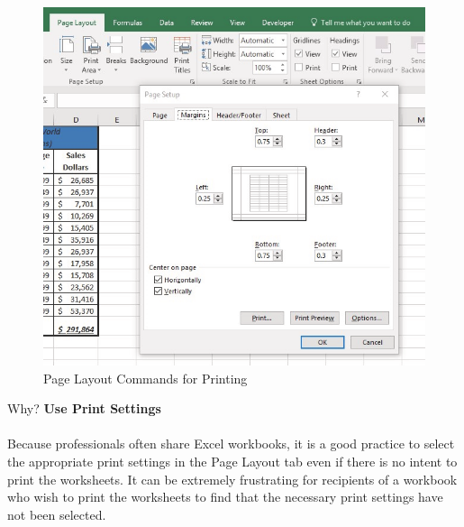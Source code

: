 \begin{figure}[H]
	\centering
	\includegraphics[width=\maxwidth{.95\linewidth}]{gfx/ch01_fig49}
	\caption{Page Layout Commands for Printing}
	\label{01:fig49}
\end{figure}

\begin{center}
	\begin{infobox}{Why?}
		\textbf{Use Print Settings}
		\\
		\\
		Because professionals often share Excel workbooks, it is a good practice to select the appropriate print settings in the Page Layout tab even if there is no intent to print the worksheets. It can be extremely frustrating for recipients of a workbook who wish to print the worksheets to find that the necessary print settings have not been selected. 
	\end{infobox}
\end{center}

